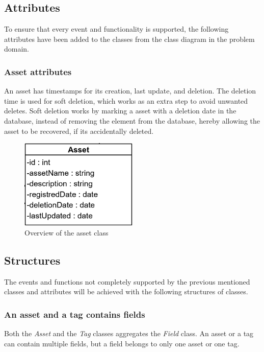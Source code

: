 \subsection{Attributes}
To ensure that every event and functionality is supported, the following attributes have been added to the classes from the class diagram in the problem domain.

\subsubsection{Asset attributes}
An asset has timestamps for its creation, last update, and deletion. The deletion time is used for soft deletion, which works as an extra step to avoid unwanted deletes. Soft deletion works by marking a asset with a deletion date in the database, instead of removing the element from the database, hereby allowing the asset to be recovered, if its accidentally deleted.

\begin{figure}[H]
    \centering
    \includegraphics[width=0.5\textwidth]{figures/AssetClassOverview.PNG}
    \caption{Overview of the asset class}
    \label{fig:AssetClassOverview}
\end{figure}

\subsection{Structures}
The events and functions not completely supported by the previous mentioned classes and attributes will be achieved with the following structures of classes.

\subsubsection{An asset and a tag contains fields}
Both the \textit{Asset} and the \textit{Tag} classes aggregates the \textit{Field} class. An asset or a tag can contain multiple fields, but a field belongs to only one asset or one tag.

